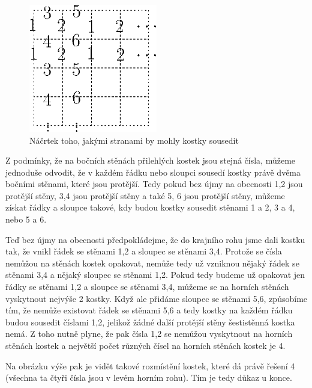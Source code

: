 \documentclass{fkssolpub}
\author{Ondřej Sedláček}
\begin{document}
\begin{figure}
	\begin{center}
		\includegraphics[width=0.5\textwidth]{2-fig}
	\end{center}
	\caption{Náčrtek toho, jakými stranami by mohly kostky sousedit}
	\label{fig:1}
\end{figure}

Z podmínky, že na bočních stěnách přilehlých kostek jsou stejná čísla, můžeme jednoduše odvodit, že v každém řádku nebo sloupci sousedí kostky právě dvěma bočními stěnami, které jsou protější. Tedy pokud bez újmy na obecnosti 1,2 jsou protější stěny, 3,4 jsou protější stěny a také 5, 6 jsou protější stěny, můžeme získat řádky a sloupce takové, kdy budou kostky sousedit stěnami 1 a 2, 3 a 4, nebo 5 a 6.

Teď bez újmy na obecnosti předpokládejme, že do krajního rohu jsme dali kostku tak, že vnikl řádek se stěnami 1,2 a sloupec se stěnami 3,4. Protože se čísla nemůžou na stěnách kostek opakovat, nemůže tedy už vzniknou nějaký řádek se stěnami 3,4 a nějaký sloupec se stěnami 1,2. Pokud tedy budeme už opakovat jen řádky se stěnami 1,2 a sloupce se stěnami 3,4, můžeme se na horních stěnách vyskytnout nejvýše 2 kostky. Když ale přidáme sloupec se stěnami 5,6, způsobíme tím, že nemůže existovat řádek se stěnami 5,6 a tedy kostky na každém řádku budou sousedit číslami 1,2, jelikož žádné další protější stěny šestistěnná kostka nemá. Z toho nutně plyne, že pak čísla 1,2 se nemůžou vyskytnout na horních stěnách kostek a největší počet různých čísel na horních stěnách kostek je 4.

Na obrázku výše pak je vidět takové rozmístění kostek, které dá právě řešení 4 (všechna ta čtyři čísla jsou v levém horním rohu). Tím je tedy důkaz u konce.
\end{document}
